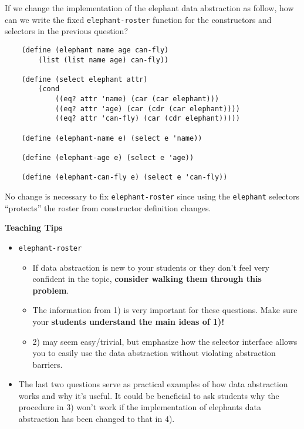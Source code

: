     
    \begin{blocksection}
    \question If we change the implementation of the elephant data abstraction as follow, how can we write the fixed \texttt{elephant-roster} function for the constructors and selectors in the previous question?
    
    \begin{lstlisting}
    (define (elephant name age can-fly) 
        (list (list name age) can-fly))
    
    (define (select elephant attr) 
        (cond 
            ((eq? attr 'name) (car (car elephant)))
            ((eq? attr 'age) (car (cdr (car elephant))))
            ((eq? attr 'can-fly) (car (cdr elephant)))))
    
    (define (elephant-name e) (select e 'name))
    
    (define (elephant-age e) (select e 'age))
    
    (define (elephant-can-fly e) (select e 'can-fly))
    \end{lstlisting}
    
    \begin{solution}[1.5in]
    No change is necessary to fix \texttt{elephant-roster} since using the
    \texttt{elephant} selectors ``protects'' the roster from constructor definition
    changes.
    \end{solution}
    
    \begin{guide}
    \textbf{Teaching Tips}
    \begin{itemize}
        \item \texttt{elephant-roster}
        \begin{itemize}
            \item If data abstraction is new to your students or they don’t feel very confident in the topic, \textbf{consider walking them through this problem}.
            \item The information from 1) is very important for these questions. Make sure your \textbf{students understand the main ideas of 1)!}
            \item 2) may seem easy/trivial, but emphasize how the selector interface allows you to easily use the data abstraction without violating abstraction barriers.
        \end{itemize}
        \item The last two questions serve as practical examples of how data abstraction works and why it's useful. It could be beneficial to ask students why the procedure in 3) won't work if the implementation of elephants data abstraction has been changed to that in 4). 
    \end{itemize}
    \end{guide}
    
    \end{blocksection}